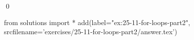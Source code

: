 
\begin{ex}
  \label{ex:25-11-for-loops-part2}
  
  \qed
\end{ex}
\begin{python0}
from solutions import *
add(label="ex:25-11-for-loops-part2",
    srcfilename='exercises/25-11-for-loops-part2/answer.tex')
\end{python0}

